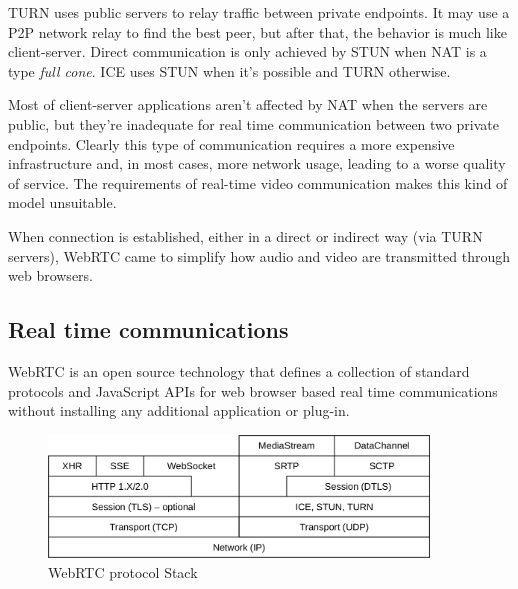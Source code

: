 \ac{TURN} uses public servers to relay traffic between private endpoints.
It may use a \ac{P2P} network relay to find the best peer, but after that, the behavior is much like client-server. Direct communication is only achieved by \ac{STUN} when \ac{NAT} is a type \emph{full cone}. \ac{ICE} uses \ac{STUN} when it's possible and \ac{TURN} otherwise.

Most of client-server applications aren't affected by \ac{NAT} when the servers are public, but they're inadequate for real time communication between two private endpoints. Clearly this type of communication requires a more expensive infrastructure and, in most cases, more network usage, leading to a worse quality of service. The requirements of real-time video communication makes this kind of model unsuitable.


When connection is established, either in a direct or indirect way (via \ac{TURN} servers), \ac{WebRTC} came to simplify how audio and video are transmitted through web browsers.

\subsection{Real time communications}\label{rtc}

\ac{WebRTC} is an open source technology that defines a collection of standard protocols and JavaScript \ac{API}s for web browser based real time communications without installing any additional application or plug-in.

\begin{figure}[H]
	\centering
	\includegraphics[width=0.9\textwidth]{figures/webrtc_stack.png}
	\caption{WebRTC protocol Stack}
\end{figure}

